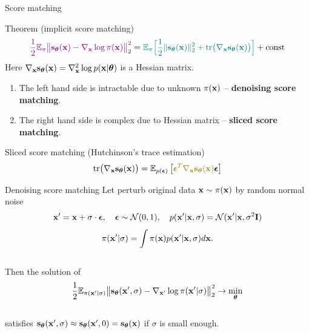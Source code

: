 \begin{frame}{Score matching}
	\vspace{-0.3cm}
	\begin{block}{Theorem (implicit score matching)}
		\vspace{-0.6cm}
		\[
		{\color{violet}\frac{1}{2} \mathbb{E}_{\pi}\bigl\| \mathbf{s}_{\boldsymbol{\theta}}(\mathbf{x}) - \nabla_{\mathbf{x}} \log \pi(\mathbf{x}) \bigr\|^2_2} = {\color{teal}\mathbb{E}_{\pi}\Bigr[ \frac{1}{2}\| \mathbf{s}_{\boldsymbol{\theta}}(\mathbf{x}) \|_2^2 + \text{tr}\bigl(\nabla_{\mathbf{x}} \mathbf{s}_{\boldsymbol{\theta}}(\mathbf{x})\bigr) \Bigr]} + \text{const}
		\]
		Here $\nabla_{\mathbf{x}} \mathbf{s}_{\boldsymbol{\theta}}(\mathbf{x}) = \nabla_{\mathbf{x}}^2 \log p(\mathbf{x} | \boldsymbol{\theta})$ is a Hessian matrix.
	\end{block}
	\begin{enumerate}
		\item {\color{violet}The left hand side} is intractable due to unknown $\pi(\mathbf{x})$ -- \textbf{denoising score matching}. 
		\item {\color{teal}The right hand side} is complex due to Hessian matrix -- \textbf{sliced score matching}.
	\end{enumerate}
	\begin{block}{Sliced score matching (Hutchinson's trace estimation)}
	\vspace{-0.3cm}
	\[
		\text{tr}\bigl(\nabla_{\bx} \bs_{\btheta}(\bx)\bigr) = \mathbb{E}_{p(\bepsilon)} \left[ {\color{olive}\bepsilon^T \nabla_{\bx} \bs_{\btheta}(\bx)} \bepsilon \right]
	\]
	\end{block}
\end{frame}
\begin{frame}{Denoising score matching}
	Let perturb original data $\mathbf{x} \sim \pi(\mathbf{x})$ by random normal noise 
	\[
		\mathbf{x}' = \mathbf{x} + \sigma \cdot \boldsymbol{\epsilon}, \quad \boldsymbol{\epsilon} \sim \mathcal{N}(0, 1), \quad p(\mathbf{x}' | \mathbf{x}, \sigma) = \mathcal{N}(\mathbf{x}' | \mathbf{x}, \sigma^2 \mathbf{I})
	\]
	\vspace{-0.4cm}
	\[
		\pi(\mathbf{x}' | \sigma) = \int \pi(\mathbf{x}) p(\mathbf{x}' | \mathbf{x}, \sigma) d\mathbf{x}.
	\]
	\vspace{-0.4cm} \\
	Then the solution of 
	\[
		\frac{1}{2} \mathbb{E}_{\pi(\mathbf{x}' | \sigma)}\bigl\| \mathbf{s}_{\boldsymbol{\theta}}(\mathbf{x}', \sigma) - \nabla_{\mathbf{x}'} \log \pi(\mathbf{x}' | \sigma) \bigr\|^2_2 \rightarrow \min_{\boldsymbol{\theta}}
	\]
	\vspace{-0.3cm} \\
	satisfies $\mathbf{s}_{\boldsymbol{\theta}}(\mathbf{x}', \sigma) \approx \mathbf{s}_{\boldsymbol{\theta}}(\mathbf{x}', 0) = \mathbf{s}_{\boldsymbol{\theta}}(\mathbf{x})$ if $\sigma$ is small enough.
\end{frame}
